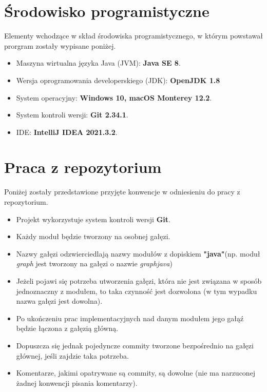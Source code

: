 \documentclass{article}
\begin{document}
\newpage

\section{Środowisko programistyczne}
Elementy wchodzące w skład środowiska programistycznego, w którym powstawał prorgram zostały wypisane poniżej.
\begin{itemize}
    \item Maszyna wirtualna języka Java (JVM): \textbf{Java SE 8}.
    \item Wersja oprogramowania developerskiego (JDK): \textbf{OpenJDK 1.8}
    \item System operacyjny: \textbf{Windows 10, macOS Monterey 12.2}.
    \item System kontroli wersji: \textbf{Git 2.34.1}.
    \item IDE: \textbf{IntelliJ IDEA 2021.3.2}.
    
\end{itemize}

\section{Praca z repozytorium}
Poniżej zostały przedstawione przyjęte konwencje w odniesieniu do pracy z repozytorium. 
\begin{itemize}
    \item Projekt wykorzystuje system kontroli wersji \textbf{Git}.
    \item Każdy moduł będzie tworzony na osobnej gałęzi.
    \item Nazwy gałęzi odzwierciedlają nazwy modułów z dopiskiem \textbf{"\textunderscore java"}\linebreak (np. moduł \emph{graph} jest tworzony na gałęzi o nazwie \emph{graph\textunderscore java})
    \item Jeżeli pojawi się potrzeba utworzenia gałęzi, która nie jest związana \linebreak w sposób jednoznaczny z modułem, to taka czynność jest dozwolona \linebreak(w tym wypadku nazwa gałęzi jest dowolna).
    \item Po ukończeniu prac implementacyjnych nad danym modułem jego gałąź będzie łączona z gałęzią główną.
    \item Dopuszcza się jednak pojedyncze commity tworzone bezpośrednio na gałęzi głównej, jeśli zajdzie taka potrzeba.
    \item Komentarze, jakimi opatrywane są commity, są dowolne (nie ma narzuconej żadnej konwencji pisania komentarzy).
\end{itemize}
\end{document}
